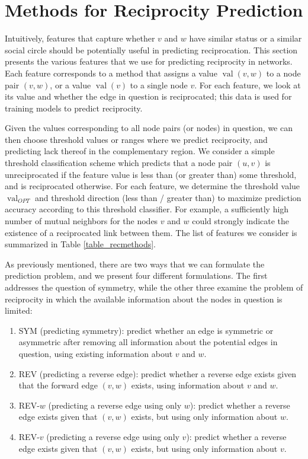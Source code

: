 \documentclass[conference]{IEEEtran}
\begin{document}
\section{Methods for Reciprocity Prediction}
Intuitively, features that capture whether $v$ and $w$ have similar status or a similar social circle should be potentially useful in predicting reciprocation. 
This section presents the various features that we use for predicting reciprocity in networks. 
Each feature corresponds to a method that assigns a value $\operatorname{val}(v,w)$ to a node pair $(v,w)$, or a value $\operatorname{val}(v)$ to a single node $v$. 
For each feature, we look at its value and whether the edge in question is reciprocated; this data is used for training models to predict reciprocity.

Given the values corresponding to all node pairs (or nodes) in question, we can then choose threshold values or ranges where we predict reciprocity, 
and predicting lack thereof in the complementary region.
We consider a simple threshold classification scheme which predicts that a node pair $(u,v)$ is unreciprocated if the feature value is less than (or greater than) some threshold, and is reciprocated otherwise.
For each feature, we determine the threshold value $\operatorname{val}_{OPT}$ and threshold direction (less than / greater than) to maximize prediction accuracy according to this threshold classifier.
For example, a sufficiently high number of mutual neighbors 
for the nodes $v$ and $w$ could strongly indicate the existence of a reciprocated link between them.
The list of features we consider is summarized in Table \ref{table_recmethods}.

As previously mentioned, there are two ways that we can formulate the prediction problem, and we present four different formulations. 
The first addresses the question of symmetry, while the other three examine the problem of reciprocity in which the available information about the nodes in question is limited:

\begin{enumerate}
\item SYM (predicting symmetry): predict whether an edge is symmetric or asymmetric after removing all information about the potential edges in question, using existing information about $v$ and $w$.
\item REV (predicting a reverse edge): predict whether a reverse edge exists given that the forward edge $(v,w)$ exists, using information about $v$ and $w$.
\item REV-$w$ (predicting a reverse edge using only $w$): predict whether a reverse edge exists given that $(v,w)$ exists, but using only information about $w$.
\item REV-$v$ (predicting a reverse edge using only $v$): predict whether a reverse edge exists given that $(v,w)$ exists, but using only information about $v$.
\end{enumerate}
\end{document}
